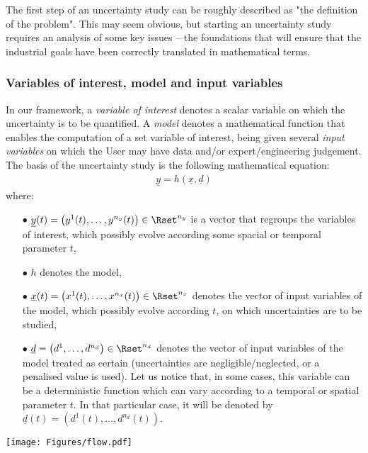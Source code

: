 The first step of an uncertainty study can be roughly described as "the definition of the problem". This may seem obvious, but starting an uncertainty study requires an analysis of some key issues -- the foundations that will ensure that the industrial goals have been correctly translated in mathematical terms.

\subsubsection{Variables of interest, model and input variables}

In our framework, a {\em variable of interest} denotes a scalar variable on which the uncertainty is to be quantified. A {\em model} denotes a mathematical function that enables the computation of a set variable of interest, being given several {\em input variables} on which the User may have data and/or expert/engineering judgement. The basis of the uncertainty study is the following mathematical equation:
\begin{align*}
  \underline{y} = h \left( \underline{x},\underline{d} \right)
\end{align*}
where:
\begin{itemize}
\item[$\bullet$] $\underline{y}(t) = \left( y^1(t),\ldots,y^{n_y}(t) \right) \in \Rset^{n_y}$ is a vector that regroups the variables of interest, which possibly evolve according some spacial or temporal parameter $t$,
\item[$\bullet$] $h$ denotes the model,
\item[$\bullet$] $\underline{x}(t) = \left( x^1(t),\ldots,x^{n_x}(t) \right) \in \Rset^{n_x}$ denotes the vector of input variables of the model, which possibly evolve according $t$, on which uncertainties are to be studied,
\item[$\bullet$] $\underline{d}= \left( d^1,\ldots,d^{n_d} \right) \in \Rset^{n_d}$ denotes the vector of input variables of the model treated as certain (uncertainties are negligible/neglected, or a penalised value is used). Let us notice that, in some cases, this variable can be a deterministic function which can vary according to a temporal or spatial parameter $t$. In that particular case, it will be denoted by $\underline{d}(t)= \left( d^1(t),\ldots,d^{n_d}(t) \right)$.
\end{itemize}

\begin{center}
  \texttt{[image: Figures/flow.pdf]}
\end{center}

